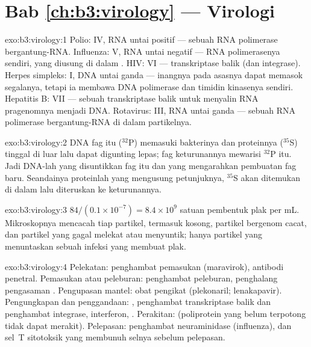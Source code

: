 \section*{Bab \ref{ch:b3:virology} --- Virologi}

\begin{solution}{exo:b3:virology:1}
Polio: IV, RNA untai positif --- sebuah RNA polimerase bergantung-RNA.
Influenza: V, RNA untai negatif --- RNA polimerasenya sendiri, yang diusung di
dalam . HIV: VI --- transkriptase balik (dan integrase). Herpes
simpleks: I, DNA untai ganda --- inangnya pada asasnya dapat memasok
segalanya, tetapi ia membawa DNA polimerase dan timidin kinasenya sendiri.
Hepatitis B: VII --- sebuah transkriptase balik untuk menyalin RNA
pragenomnya menjadi DNA. Rotavirus: III, RNA untai ganda --- sebuah RNA
polimerase bergantung-RNA di dalam partikelnya.
\end{solution}

\begin{solution}{exo:b3:virology:2}
DNA fag itu ($^{32}$P) memasuki bakterinya dan proteinnya
($^{35}$S) tinggal di luar lalu dapat digunting lepas; fag keturunannya
mewarisi $^{32}$P itu. Jadi DNA-lah yang disuntikkan fag itu dan yang
mengarahkan pembuatan fag baru. Seandainya proteinlah yang mengusung
petunjuknya, $^{35}$S akan ditemukan di dalam lalu diteruskan ke keturunannya.
\end{solution}

\begin{solution}{exo:b3:virology:3}
$84/(0.1\times 10^{-7}) = 8.4\times 10^{9}$ satuan pembentuk plak per mL.
Mikroskopnya mencacah tiap partikel, termasuk  kosong, partikel
bergenom cacat, dan partikel yang gagal melekat atau menyuntik; hanya
partikel yang menuntaskan sebuah infeksi yang membuat plak.
\end{solution}

\begin{solution}{exo:b3:virology:4}
Pelekatan: penghambat pemasukan (maravirok), antibodi penetral.
Pemasukan atau peleburan: penghambat peleburan, penghalang pengasaman .
Pengupasan mantel: obat pengikat  (plekonaril; lenakapavir).
Pengungkapan dan penggandaan: , penghambat transkriptase
balik dan penghambat integrase, interferon, . Perakitan:
 (poliprotein yang belum terpotong tidak dapat merakit).
Pelepasan: penghambat neuraminidase (influenza), dan sel~T sitotoksik yang
membunuh selnya sebelum pelepasan.
\end{solution}

